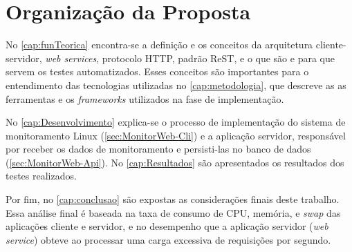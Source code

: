 \section{Organização da Proposta} \label{Sec:Organizacao}

No \autoref{cap:funTeorica} encontra-se a definição e os conceitos da arquitetura cliente-servidor, \textit{web services}, protocolo HTTP, padrão ReST, e o que são e para que servem os testes automatizados. Esses conceitos são importantes para o entendimento das tecnologias utilizadas no \autoref{cap:metodologia}, que descreve as as ferramentas e os \textit{frameworks} utilizados na fase de implementação.

No \autoref{cap:Desenvolvimento} explica-se o processo de implementação do sistema de monitoramento Linux (\autoref{sec:MonitorWeb-Cli}) e a aplicação servidor, responsável por receber os dados de monitoramento e persisti-las no banco de dados (\autoref{sec:MonitorWeb-Api}). No \autoref{cap:Resultados} são apresentados os resultados dos testes realizados.

Por fim, no \autoref{cap:conclusao} são expostas as considerações finais deste trabalho. Essa análise final é baseada na taxa de consumo de CPU, memória, e \textit{swap} das aplicações cliente e servidor, e no desempenho que a aplicação servidor (\textit{web service}) obteve ao processar uma carga excessiva de requisições por segundo.
